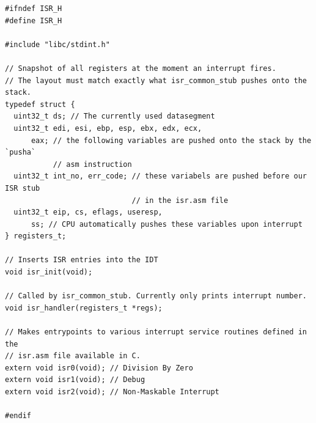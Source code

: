 \documentclass[../main.tex]{subfiles}
\begin{document}
\label{lst:isr_h}
\begin{verbatim}
#ifndef ISR_H
#define ISR_H

#include "libc/stdint.h"

// Snapshot of all registers at the moment an interrupt fires.
// The layout must match exactly what isr_common_stub pushes onto the stack.
typedef struct {
  uint32_t ds; // The currently used datasegment
  uint32_t edi, esi, ebp, esp, ebx, edx, ecx,
      eax; // the following variables are pushed onto the stack by the `pusha`
           // asm instruction
  uint32_t int_no, err_code; // these variabels are pushed before our ISR stub
                             // in the isr.asm file
  uint32_t eip, cs, eflags, useresp,
      ss; // CPU automatically pushes these variables upon interrupt
} registers_t;

// Inserts ISR entries into the IDT
void isr_init(void);

// Called by isr_common_stub. Currently only prints interrupt number.
void isr_handler(registers_t *regs);

// Makes entrypoints to various interrupt service routines defined in the
// isr.asm file available in C.
extern void isr0(void); // Division By Zero
extern void isr1(void); // Debug
extern void isr2(void); // Non-Maskable Interrupt

#endif

\end{verbatim}
\end{document}
